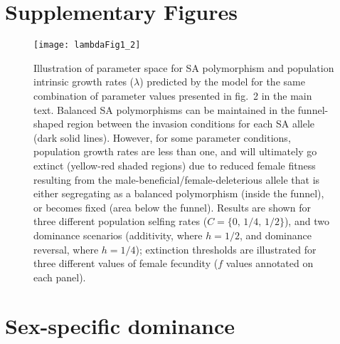 \documentclass[11pt]{article}
\begin{document}
\section{Supplementary Figures}
\renewcommand{\thefigure}{S\arabic{equation}}
\setcounter{figure}{1}  %
\setcounter{equation}{1}  %
\setcounter{table}{1}  %



 \begin{figure}[htbp]
 \centering
 \texttt{[image: lambdaFig1\_2]}
 \caption{\footnotesize{Illustration of parameter space for SA polymorphism and population intrinsic growth rates ($\lambda$) predicted by the model for the same combination of parameter values presented in fig.~2 in the main text. Balanced SA polymorphisms can be maintained in the funnel-shaped region between the invasion conditions for each SA allele (dark solid lines). However, for some parameter conditions, population growth rates are less than one, and will ultimately go extinct (yellow-red shaded regions) due to reduced female fitness resulting from the male-beneficial/female-deleterious allele that is either segregating as a balanced polymorphism (inside the funnel), or becomes fixed (area below the funnel). Results are shown for three different population selfing rates ($C = \{0,\,1/4,\,1/2\}$), and two dominance scenarios (additivity, where $h = 1/2$, and dominance reversal, where $h = 1/4$); extinction thresholds are illustrated for three different values of female fecundity ($f$ values annotated on each panel).}}
 \label{fig:LambdaOverviewFig}
 \end{figure}


\newpage{}
\section{Sex-specific dominance}
\renewcommand{\thefigure}{S\arabic{equation}}
\setcounter{equation}{1}  %
\setcounter{table}{1}  %
\end{document}
